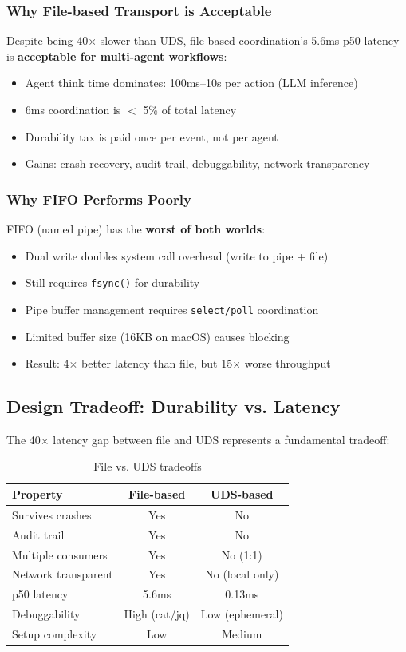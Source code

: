 \documentclass[11pt]{article}
\begin{document}
\subsubsection{Why File-based Transport is Acceptable}

Despite being 40$\times$ slower than UDS, file-based coordination's 5.6ms p50 latency is \textbf{acceptable for multi-agent workflows}:

\begin{itemize}
\item Agent think time dominates: 100ms--10s per action (LLM inference)
\item 6ms coordination is $<$ 5\% of total latency
\item Durability tax is paid once per event, not per agent
\item Gains: crash recovery, audit trail, debuggability, network transparency
\end{itemize}

\subsubsection{Why FIFO Performs Poorly}

FIFO (named pipe) has the \textbf{worst of both worlds}:

\begin{itemize}
\item Dual write doubles system call overhead (write to pipe + file)
\item Still requires \texttt{fsync()} for durability
\item Pipe buffer management requires \texttt{select/poll} coordination
\item Limited buffer size (16KB on macOS) causes blocking
\item Result: 4$\times$ better latency than file, but 15$\times$ worse throughput
\end{itemize}

\subsection{Design Tradeoff: Durability vs. Latency}

The 40$\times$ latency gap between file and UDS represents a fundamental tradeoff:

\begin{table}[h]
\centering
\begin{tabular}{@{}lcc@{}}
\toprule
\textbf{Property} & \textbf{File-based} & \textbf{UDS-based} \\ \midrule
Survives crashes & Yes & No \\
Audit trail & Yes & No \\
Multiple consumers & Yes & No (1:1) \\
Network transparent & Yes & No (local only) \\
p50 latency & 5.6ms & 0.13ms \\
Debuggability & High (cat/jq) & Low (ephemeral) \\
Setup complexity & Low & Medium \\
\bottomrule
\end{tabular}
\caption{File vs. UDS tradeoffs}
\end{table}
\end{document}
